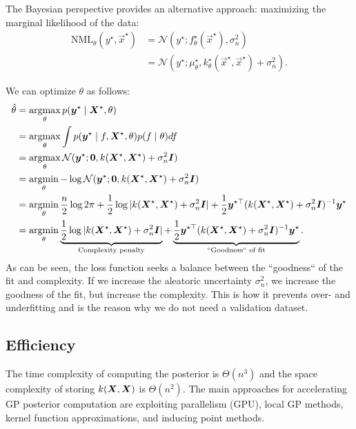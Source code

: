 The Bayesian perspective provides an alternative approach: maximizing the
marginal likelihood of the data:
\begin{align*}
  \text{NML}_{\theta}(y^\star,\vec{x}^\star) &= \mathcal{N}(y^\star; f_{\theta}^\star(\vec{x}^\star), \sigma_n^2) \\
  &= \mathcal{N}(y^\star; \mu_{\theta}^\star, k_{\theta}^\star(\vec{x}^\star,\vec{x}^\star) + \sigma_n^2)
.\end{align*}

We can optimize $\theta$ as follows:
\begin{align*}
  \hat{\theta} &= \operatorname*{argmax}_\theta p(\bm{y}^\star\mid \bm{X}^\star, \theta) \\
  &= \operatorname*{argmax}_\theta \int p(\bm{y}^\star\mid f,\bm{X}^\star, \theta) p(f\mid \theta) df \\
  &= \operatorname*{argmax}_\theta \mathcal{N}(\bm{y}^\star; \bm{0}, k(\bm{X}^\star,\bm{X}^\star) + \sigma_n^2\bm{I}) \\
  &= \operatorname*{argmin}_\theta -\log \mathcal{N}(\bm{y}^\star; \bm{0}, k(\bm{X}^\star,\bm{X}^\star) + \sigma_n^2\bm{I}) \\
  &= \operatorname*{argmin}_\theta \frac{n}{2} \log 2\pi + \frac{1}{2}\log |k(\bm{X}^\star,\bm{X}^\star)+\sigma_n^2\bm{I}|+ \frac{1}{2}\bm{y}^{\star\top} (k(\bm{X}^\star,\bm{X}^\star) + \sigma_n^2\bm{I})^{-1}\bm{y}^\star \\
  &= \operatorname*{argmin}_\theta \underbrace{\frac{1}{2}\log |k(\bm{X}^\star,\bm{X}^\star)+\sigma_n^2\bm{I}|}_{\text{Complexity penalty}} + \underbrace{\frac{1}{2}\bm{y}^{\star\top} (k(\bm{X}^\star,\bm{X}^\star) + \sigma_n^2\bm{I})^{-1}\bm{y}^\star}_{\text{``Goodness`` of fit}}
.\end{align*}
As can be seen, the loss function seeks a balance between the ``goodness`` of
the fit and complexity. If we increase the aleatoric uncertainty
$\sigma_n^2$, we increase the goodness of the fit, but increase the
complexity. This is how it prevents over- and underfitting and is the reason
why we do not need a validation dataset.


\subsection{Efficiency}

The time complexity of computing the posterior is $\Theta(n^3)$ and the space complexity of storing
$k(\bm{X},\bm{X})$ is $\Theta(n^2)$. The main approaches for accelerating GP
posterior computation are exploiting parallelism (GPU), local
GP methods, kernel function approximations, and inducing point methods.

